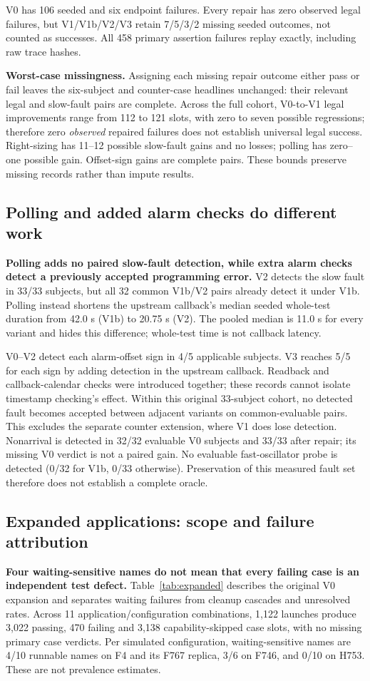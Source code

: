 \documentclass[sigconf,nonacm,balance=false]{acmart}
\begin{document}
V0 has 106 seeded and six endpoint failures. Every repair has zero observed legal failures, but V1/V1b/V2/V3 retain 7/5/3/2 missing seeded outcomes, not counted as successes. All 458 primary assertion failures replay exactly, including raw trace hashes.

\textbf{Worst-case missingness.} Assigning each missing repair outcome either pass or fail leaves the six-subject and counter-case headlines unchanged: their relevant legal and slow-fault pairs are complete. Across the full cohort, V0-to-V1 legal improvements range from 112 to 121 slots, with zero to seven possible regressions; therefore zero \emph{observed} repaired failures does not establish universal legal success. Right-sizing has 11--12 possible slow-fault gains and no losses; polling has zero--one possible gain. Offset-sign gains are complete pairs. These bounds preserve missing records rather than impute results.

\subsection{Polling and added alarm checks do different work}
\textbf{Polling adds no paired slow-fault detection, while extra alarm checks detect a previously accepted programming error.} V2 detects the slow fault in 33/33 subjects, but all 32 common V1b/V2 pairs already detect it under V1b. Polling instead shortens the upstream callback's median seeded whole-test duration from 42.0 s (V1b) to 20.75 s (V2). The pooled median is 11.0 s for every variant and hides this difference; whole-test time is not callback latency.

V0--V2 detect each alarm-offset sign in 4/5 applicable subjects. V3 reaches 5/5 for each sign by adding detection in the upstream callback. Readback and callback-calendar checks were introduced together; these records cannot isolate timestamp checking's effect. Within this original 33-subject cohort, no detected fault becomes accepted between adjacent variants on common-evaluable pairs. This excludes the separate counter extension, where V1 does lose detection. Nonarrival is detected in 32/32 evaluable V0 subjects and 33/33 after repair; its missing V0 verdict is not a paired gain. No evaluable fast-oscillator probe is detected (0/32 for V1b, 0/33 otherwise). Preservation of this measured fault set therefore does not establish a complete oracle.

\subsection{Expanded applications: scope and failure attribution}
\textbf{Four waiting-sensitive names do not mean that every failing case is an independent test defect.} Table~\ref{tab:expanded} describes the original V0 expansion and separates waiting failures from cleanup cascades and unresolved rates. Across 11 application/configuration combinations, 1,122 launches produce 3,022 passing, 470 failing and 3,138 capability-skipped case slots, with no missing primary case verdicts. Per simulated configuration, waiting-sensitive names are 4/10 runnable names on F4 and its F767 replica, 3/6 on F746, and 0/10 on H753. These are not prevalence estimates.
\end{document}
